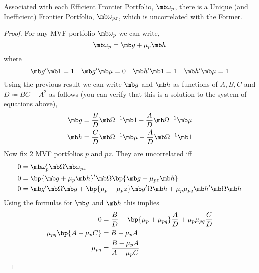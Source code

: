 \begin{solution}
\begin{enumerate}
    \begin{result}
        Associated with each Efficient Frontier Portfolio, \(\mb\omega_p\), there is a Unique (and Inefficient) Frontier Portfolio, \(\mb \omega_{pz}\), which is uncorrelated with the Former.
    \end{result}
    \begin{proof}
        For any MVF portfolio \(\mb\omega_p\) we can write,
        \[
            \mb\omega_p = \mb g + \mu_p\mb h
        \]
        where 
        \[
            \mb g^\prime \mb 1 = 1 \quad \mb g^\prime\mb\mu = 0 \quad \mb h^\prime\mb 1 = 1 \quad \mb h^\prime \mb \mu = 1
        \] 
        Using the previous result we can write \(\mb g\) and \(\mb h\) as functions of \(A,B,C\) and \(D \coloneqq BC-A^2\) as follows (you can verify that this is a solution to the system of equations above),
        \begin{align*}
            \mb g & = \frac{B}{D} \mb\Omega^{-1}\mb 1 - \frac{A}{D}\mb\Omega^{-1}\mb \mu \\
            \mb h& = \frac{C}{D} \mb\Omega^{-1}\mb \mu - \frac{A}{D}\mb\Omega^{-1}\mb 1
        \end{align*}
        Now fix 2 MVF portfolios \(p\) and \(pz\). They are uncorrelated iff
        \begin{align*}
            0 & = \mb\omega_p^\prime \mb\Omega \mb\omega_{pz} \\
            0 & =  \bp{\mb g + \mu_p\mb h}^\prime \mb\Omega \bp{\mb g + \mu_{pz}\mb h} \\
            0 & = \mb g^\prime \mb \Omega \mb g + \bp{\mu_p+\mu_pz}\mb g^\prime\Omega\mb h + \mu_p\mu_{pq}\mb h^\prime\mb\Omega\mb h 
        \end{align*}
        Using the formulas for \(\mb g\) and \(\mb h\) this implies
        \begin{align*}
            0 & = \frac{B}{D} - \bp{\mu_p+\mu_{pq}}\frac{A}{D} + \mu_p\mu_{pq}\frac{C}{D} \\
            \mu_{pq}\bp{A - \mu_p C} & = B -\mu_pA \\
            \mu_{pq} & = \frac{B-\mu_pA}{A-\mu_pC}
        \end{align*}
    \end{proof}


\end{enumerate}
\end{solution}
